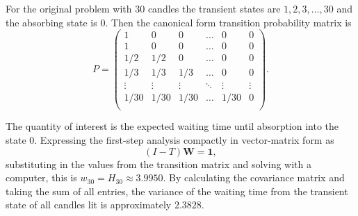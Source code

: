 \documentclass[12pt]{article}
\begin{document}
\begin{example}
    For the original problem with \( 30 \) candles the transient states
    are \( 1, 2, 3, \dots, 30 \) and the absorbing state is \( 0 \).
    Then the canonical form transition probability matrix is
    \[
        P =
        \begin{pmatrix}
            1 & 0 & 0 & \ldots & 0 & 0 \\
            1 & 0 & 0 & \ldots & 0 & 0 \\
            1/2 & 1/2 & 0 & \ldots & 0 & 0 \\
            1/3 & 1/3 & 1/3 & \ldots & 0 & 0 \\
            \vdots & \vdots & \vdots & \ddots & \vdots & \vdots \\
            1/30 & 1/30 & 1/30 & \ldots & 1/30 & 0 \\
        \end{pmatrix}
        .
    \]

    The quantity of interest is the expected waiting time until
    absorption into the state \( 0 \).  Expressing the first-step
    analysis compactly in vector-matrix form as
    \[
        (I - T) \mathbf{W} = \mathbf{1},
    \] substituting in the values from the transition matrix and solving
    with a computer, this is \( w_{30} = H_{30} \approx 3.9950 \). By
    calculating the covariance matrix and taking the sum of all entries,
    the variance of the waiting time from the transient state of all
    candles lit is approximately \( 2.3828 \).
\end{example}
\end{document}
